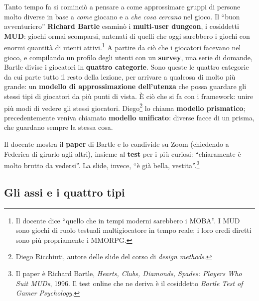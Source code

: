 Tanto tempo fa si cominciò a pensare a come approssimare gruppi di persone molto
diverse in base a \emph{come} giocano e a \emph{che cosa cercano} nel gioco. Il
``buon avventuriero'' \textbf{Richard Bartle} esaminò i \textbf{multi-user dungeon},
i cosiddetti \textbf{MUD}: giochi ormai scomparsi, antenati di quelli che oggi
sarebbero i giochi con enormi quantità di utenti attivi.\footnote{Il docente dice
``quello che in tempi moderni sarebbero i MOBA''. I MUD sono giochi di ruolo
testuali multigiocatore in tempo reale; i loro eredi diretti sono più propriamente i
MMORPG.} A partire da ciò che i giocatori facevano nel gioco, e compilando un
profilo degli utenti con un \textbf{survey}, una serie di domande, Bartle divise i
giocatori in \textbf{quattro categorie}. Sono queste le quattro categorie da cui
parte tutto il resto della lezione, per arrivare a qualcosa di molto più grande: un
\textbf{modello di approssimazione dell'utenza} che possa guardare gli stessi tipi
di giocatori da più punti di vista. È ciò che si fa con i framework: unire più modi
di vedere gli stessi giocatori. Diego\footnote{Diego Ricchiuti, autore delle slide
del corso di \emph{design methods}.} lo chiama \textbf{modello prismatico};
precedentemente veniva chiamato \textbf{modello unificato}: diverse facce di un
prisma, che guardano sempre la stessa cosa.

Il docente mostra il \textbf{paper} di Bartle e lo condivide su Zoom (chiedendo a
Federica di girarlo agli altri), insieme al \textbf{test} per i più curiosi:
``chiaramente è molto brutto da vedersi''. La slide, invece, ``è già bella,
vestita''.\footnote{Il paper è Richard Bartle, \emph{Hearts, Clubs, Diamonds,
Spades: Players Who Suit MUDs}, 1996. Il test online che ne deriva è il cosiddetto
\emph{Bartle Test of Gamer Psychology}.}


\subsection{Gli assi e i quattro tipi}

